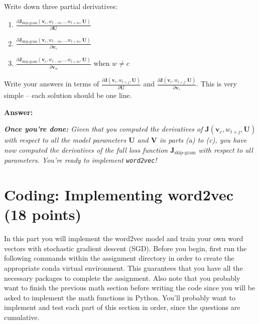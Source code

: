 \documentclass{article}
\newenvironment{answer}{
        {\bf Answer:} \sf \begingroup\color{red}
    }{\endgroup}%
\begin{document}
\begin{enumerate}
        Write down three partial derivatives:
        \begin{enumerate}
            [label=(\roman*)]
            \item ${\frac{\partial \bm J_{\textrm{skip-gram}}(\bm v_c, w_{t-m},\ldots w_{t+m}, \bm U)} {\partial \bm U}}$
            \item ${\frac{\partial \bm J_{\textrm{skip-gram}}(\bm v_c, w_{t-m},\ldots w_{t+m}, \bm U)} {\partial \bm v_c}}$
            \item ${\frac{\partial \bm J_{\textrm{skip-gram}}(\bm v_c, w_{t-m},\ldots w_{t+m}, \bm U)} {\partial \bm v_w}}$ when $w \ne c$
        \end{enumerate}
        Write your answers in terms of ${\frac{\partial \bm J(\bm v_c, w_{t+j}, \bm U)}{\partial \bm U}}$ and ${\frac{\partial \bm J(\bm v_c, w_{t+j}, \bm U)}{\partial \bm v_c}}$. This is very simple -- each solution should be one line.

        \begin{shaded}
            \begin{answer}

            \end{answer}
        \end{shaded}

        \textit{\textbf{Once you're done:} Given that you computed the derivatives of $\bm J(\bm v_c, w_{t+j}, \bm U)$ with respect to all the model parameters $\bm U$ and $\bm V$ in parts (a) to (c), you have now computed the derivatives of the full loss function $\bm J_{\text{skip-gram}}$ with respect to all parameters. You're ready to implement \texttt{word2vec}!} %

    \end{enumerate}


    \section{Coding: Implementing word2vec (18 points)}
    In this part you will implement the word2vec model and train your own word vectors with stochastic gradient descent (SGD). Before you begin, first run the following commands within the assignment directory in order to create the appropriate conda virtual environment. This guarantees that you have all the necessary packages to complete the assignment. Also note that you probably want to finish the previous math section before writing the code since you will be asked to implement the math functions in Python. You’ll probably want to implement and test each part of this section in order, since the questions are cumulative.
\end{document}
